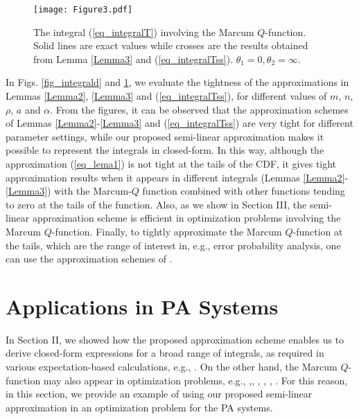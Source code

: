 \begin{figure}
\centering
  \texttt{[image: Figure3.pdf]}\\
\caption{The integral (\ref{eq_integralT}) involving the Marcum $Q$-function. Solid lines are exact values while crosses are the results obtained from Lemma \ref{Lemma3} and (\ref{eq_integralTss}). $\theta_1 = 0, \theta_2 = \infty$. }\label{fig_t2}
\end{figure}



In Figs. \ref{fig_integrald} and \ref{fig_t2}, we evaluate the tightness of the approximations in Lemmas \ref{Lemma2}, \ref{Lemma3} and (\ref{eq_integralTss}), for different values of $m$, $n$, $\rho$, $a$ and $\alpha$. From the figures, it can be observed that the approximation schemes of   Lemmas \ref{Lemma2}-\ref{Lemma3} and (\ref{eq_integralTss}) are very tight for different parameter settings, while our proposed semi-linear approximation makes it possible to represent the integrals in closed-form.  In this way, although the approximation (\ref{eq_lema1}) is not tight at the tails of the CDF, it gives tight approximation results when it appears in different integrals (Lemmas \ref{Lemma2}-\ref{Lemma3}) with the Marcum-$Q$ function  combined with other functions tending to zero at the tails of the function. Also, as we show in Section III, the semi-linear approximation scheme is efficient in optimization problems involving the Marcum $Q$-function. Finally, to tightly approximate the Marcum $Q$-function at the tails, which are the range of interest in, e.g., error probability analysis, one can use the approximation schemes of \cite{Simon2000TCexponential,annamalai2001WCMCcauchy}. 






\section{Applications in PA Systems}
In Section II, we showed how the proposed approximation scheme enables us to derive closed-form expressions for a broad range of integrals, as required in various expectation-based calculations, e.g., \cite{Simon2003TWCsome,Cao2016CLsolutions,sofotasios2015solutions,Cui2012ELtwo,Gaur2003TVTsome,Simon2000TCexponential,6911973}. On the other hand, the Marcum $Q$-function may also  appear in  optimization problems, e.g., \cite[eq. (8)]{Azari2018TCultra},\cite[eq. (9)]{Alam2014INFOCOMWrobust}, \cite[eq. (10)]{Gao2018IAadmm}, \cite[eq. (10)]{Shen2018TVToutage}, \cite[eq. (15)]{Song2017JLTimpact}, \cite[eq. (22)]{Tang2019IAan}.  For this reason, in this section, we provide an example of using our proposed semi-linear approximation in an optimization problem for the PA systems.

